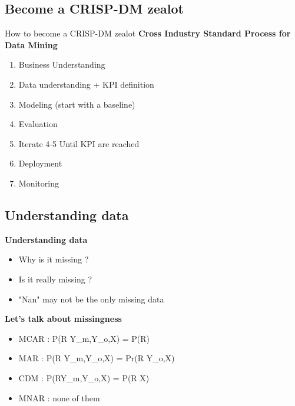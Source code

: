 \documentclass{beamer}
\begin{document}
\subsection{Become a CRISP-DM zealot}
\begin{frame}
        \Large{How to become a CRISP-DM zealot}
	\textbf{Cross Industry Standard Process for Data Mining}
	\begin{enumerate}
		\item<1- | alert@1> Business Understanding 
		\item<2- | alert@2> Data understanding + KPI definition 
		\item<3- | alert@3> Modeling (start with a baseline) 
		\item<4- | alert@4> Evaluation  
		\item<5- | alert@5> Iterate 4-5 Until KPI are reached 
		\item<6- | alert@6> Deployment  
		\item<8- | alert@7> Monitoring 
	\end{enumerate}
\end{frame}

\subsection{Understanding data}
\begin{frame}
        \textbf{Understanding data}
	\begin{itemize}
		\item<1- | alert@1> Why is it missing ? 
		\item<2- | alert@2> Is it really missing ?  
		\item<3- | alert@3> "Nan" may not be the only missing data
	\end{itemize}
\end{frame}

\begin{frame}
	\textbf{Let's talk about missingness}
	\begin{itemize}
		\item<1- | alert@1> MCAR : P(R \vert Y_m,Y_o,X) = P(R) 
		\item<2- | alert@2> MAR : P(R \vert Y_m,Y_o,X) = Pr(R \vert Y_o,X)
		\item<3- | alert@3> CDM : P(R\vert Y_m,Y_o,X) = P(R \vert X) 
                \item<4- | alert@4> MNAR : none of them
	\end{itemize}
\end{frame}
\end{document}
